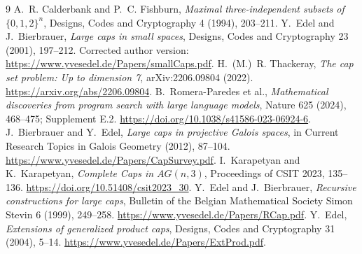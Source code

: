 \documentclass[11pt]{article}
\begin{document}
\begin{thebibliography}{9}
A.~R. Calderbank and P.~C. Fishburn,
\emph{Maximal three-independent subsets of $\{0,1,2\}^n$},
Designs, Codes and Cryptography 4 (1994), 203--211.
Y.~Edel and J.~Bierbrauer,
\emph{Large caps in small spaces},
Designs, Codes and Cryptography 23 (2001), 197--212.
Corrected author version:
\url{https://www.yvesedel.de/Papers/smallCaps.pdf}.
H.~(M.)~R. Thackeray,
\emph{The cap set problem: Up to dimension 7},
arXiv:2206.09804 (2022).
\url{https://arxiv.org/abs/2206.09804}.
B.~Romera-Paredes et al.,
\emph{Mathematical discoveries from program search with large language models},
Nature 625 (2024), 468--475; Supplement E.2.
\url{https://doi.org/10.1038/s41586-023-06924-6}.
J.~Bierbrauer and Y.~Edel,
\emph{Large caps in projective Galois spaces},
in Current Research Topics in Galois Geometry (2012), 87--104.
\url{https://www.yvesedel.de/Papers/CapSurvey.pdf}.
I.~Karapetyan and K.~Karapetyan,
\emph{Complete Caps in $AG(n,3)$},
Proceedings of CSIT 2023, 135--136.
\url{https://doi.org/10.51408/csit2023_30}.
Y.~Edel and J.~Bierbrauer,
\emph{Recursive constructions for large caps},
Bulletin of the Belgian Mathematical Society Simon Stevin 6 (1999), 249--258.
\url{https://www.yvesedel.de/Papers/RCap.pdf}.
Y.~Edel,
\emph{Extensions of generalized product caps},
Designs, Codes and Cryptography 31 (2004), 5--14.
\url{https://www.yvesedel.de/Papers/ExtProd.pdf}.
\end{thebibliography}
\end{document}
